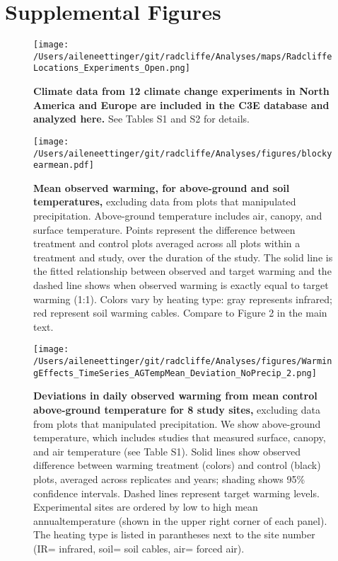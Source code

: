 \documentclass{article}
\begin{document}
\section* {Supplemental Figures}
\begin{figure}[p]
\centering
\texttt{[image: /Users/aileneettinger/git/radcliffe/Analyses/maps/RadcliffeLocations\_Experiments\_Open.png]} 
\caption{\textbf{Climate data from 12 climate change experiments in North America and Europe are included in the C3E database and analyzed here.} See Tables S1 and S2 for details.} 
\label{fig:map}
\end{figure}
\clearpage
\begin{figure}[h]
\centering
\texttt{[image: /Users/aileneettinger/git/radcliffe/Analyses/figures/blockyearmean.pdf]}
\caption{\textbf{Mean observed warming, for above-ground and soil temperatures,} excluding data from plots that manipulated precipitation. Above-ground temperature includes air, canopy, and surface temperature. Points represent the difference between treatment and control plots averaged across all plots within a treatment and study, over the duration of the study. The solid line is the fitted relationship between observed and target warming and the dashed line shows when observed warming is exactly equal to target warming (1:1). Colors vary by heating type: gray represents infrared; red represent soil warming cables. Compare to Figure 2 in the main text.}
 \label{fig:blockyear}
 \end{figure}
\clearpage
\begin{figure}[h]
\centering
\texttt{[image: /Users/aileneettinger/git/radcliffe/Analyses/figures/WarmingEffects\_TimeSeries\_AGTempMean\_Deviation\_NoPrecip\_2.png]}
\caption{\textbf{Deviations in daily observed warming from mean control above-ground temperature for 8 study sites,} excluding data from plots that manipulated precipitation. We show above-ground temperature, which includes studies that measured surface, canopy, and air temperature (see Table S1). Solid lines show observed difference between warming treatment (colors) and control (black) plots, averaged across replicates and years; shading shows 95\% confidence intervals. Dashed lines represent target warming levels. Experimental sites are ordered by low to high mean annualtemperature (shown in the upper right corner of each panel). The heating type is listed in parantheses next to the site number (IR= infrared, soil= soil cables, air= forced air).} 
\label{fig:effwarmagtemp}
\end{figure}

% 
\end{document}
